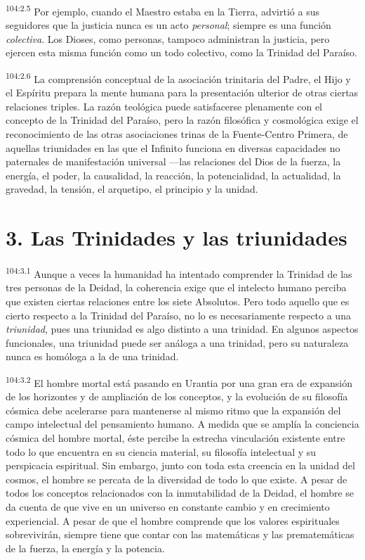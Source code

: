 \par
\textsuperscript{104:2.5} Por ejemplo, cuando el Maestro estaba en la Tierra, advirtió a sus seguidores que la justicia nunca es un acto \textit{personal}; siempre es una función \textit{colectiva}. Los Dioses, como personas, tampoco administran la justicia, pero ejercen esta misma función como un todo colectivo, como la Trinidad del Paraíso.

\par
\textsuperscript{104:2.6} La comprensión conceptual de la asociación trinitaria del Padre, el Hijo y el Espíritu prepara la mente humana para la presentación ulterior de otras ciertas relaciones triples. La razón teológica puede satisfacerse plenamente con el concepto de la Trinidad del Paraíso, pero la razón filosófica y cosmológica exige el reconocimiento de las otras asociaciones trinas de la Fuente-Centro Primera, de aquellas triunidades en las que el Infinito funciona en diversas capacidades no paternales de manifestación universal ---las relaciones del Dios de la fuerza, la energía, el poder, la causalidad, la reacción, la potencialidad, la actualidad, la gravedad, la tensión, el arquetipo, el principio y la unidad.

\section*{3. Las Trinidades y las triunidades}
\par
\textsuperscript{104:3.1} Aunque a veces la humanidad ha intentado comprender la Trinidad de las tres personas de la Deidad, la coherencia exige que el intelecto humano perciba que existen ciertas relaciones entre los siete Absolutos. Pero todo aquello que es cierto respecto a la Trinidad del Paraíso, no lo es necesariamente respecto a una \textit{triunidad}, pues una triunidad es algo distinto a una trinidad. En algunos aspectos funcionales, una triunidad puede ser análoga a una trinidad, pero su naturaleza nunca es homóloga a la de una trinidad.

\par
\textsuperscript{104:3.2} El hombre mortal está pasando en Urantia por una gran era de expansión de los horizontes y de ampliación de los conceptos, y la evolución de su filosofía cósmica debe acelerarse para mantenerse al mismo ritmo que la expansión del campo intelectual del pensamiento humano. A medida que se amplía la conciencia cósmica del hombre mortal, éste percibe la estrecha vinculación existente entre todo lo que encuentra en su ciencia material, su filosofía intelectual y su perspicacia espiritual. Sin embargo, junto con toda esta creencia en la unidad del cosmos, el hombre se percata de la diversidad de todo lo que existe. A pesar de todos los conceptos relacionados con la inmutabilidad de la Deidad, el hombre se da cuenta de que vive en un universo en constante cambio y en crecimiento experiencial. A pesar de que el hombre comprende que los valores espirituales sobrevivirán, siempre tiene que contar con las matemáticas y las prematemáticas de la fuerza, la energía y la potencia.

